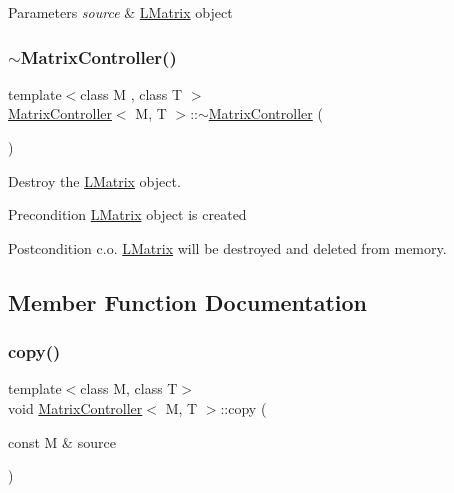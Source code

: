 \begin{DoxyParams}{Parameters}
{\em source} & \mbox{\hyperlink{class_l_matrix}{L\+Matrix}} object \\
\hline
\end{DoxyParams}
\mbox{\label{class_matrix_controller_ac3e8818bb538155c6cb7a46a9ec92ece}} 
\subsubsection{\texorpdfstring{$\sim$MatrixController()}{~MatrixController()}}
{\footnotesize\ttfamily template$<$class M , class T $>$ \\
\mbox{\hyperlink{class_matrix_controller}{Matrix\+Controller}}$<$ M, T $>$\+::$\sim$\mbox{\hyperlink{class_matrix_controller}{Matrix\+Controller}} (\begin{DoxyParamCaption}{ }\end{DoxyParamCaption})}



Destroy the \mbox{\hyperlink{class_l_matrix}{L\+Matrix}} object. 

\begin{DoxyPrecond}{Precondition}
\mbox{\hyperlink{class_l_matrix}{L\+Matrix}} object is created 
\end{DoxyPrecond}
\begin{DoxyPostcond}{Postcondition}
c.\+o. \mbox{\hyperlink{class_l_matrix}{L\+Matrix}} will be destroyed and deleted from memory. 
\end{DoxyPostcond}


\subsection{Member Function Documentation}
\mbox{\label{class_matrix_controller_aced34d0065a5df3d3fadb140a782a22b}} 
\subsubsection{\texorpdfstring{copy()}{copy()}}
{\footnotesize\ttfamily template$<$class M, class T$>$ \\
void \mbox{\hyperlink{class_matrix_controller}{Matrix\+Controller}}$<$ M, T $>$\+::copy (\begin{DoxyParamCaption}\item[{const M \&}]{source }\end{DoxyParamCaption})}




